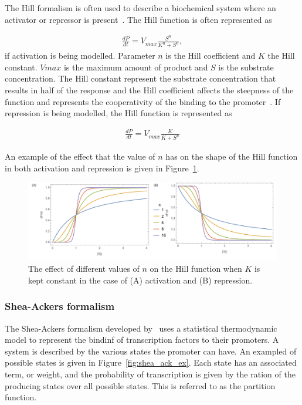 The Hill formalism is often used to describe a biochemical system where an activator or repressor is present~\autocite{Alon:2007}. The Hill function is often represented as

\begin{align*}
	\frac{dP}{dt} = V_{max}\frac{S^n}{K^n + S^n},
\end{align*}
\noindent if activation is being modelled. Parameter $n$ is the Hill coefficient and $K$ the Hill constant. $V{max}$ is the maximum amount of product and $S$ is the substrate concentration. The Hill constant represent the substrate concentration that results in half of the response and the Hill coefficient affects the steepness of the function and represents the cooperativity of the binding to the promoter~\autocite{Alon:2007}. If repression is being modelled, the Hill function is represented as

\begin{align*}
	\frac{dP}{dt} = V_{max}\frac{K}{K + S^n}
\end{align*}



\noindent An example of the effect that the value of $n$ has on the shape of the Hill function in both activation and repression is given in Figure~\ref{fig:hill_ex}.
\newpage

\begin{figure}[htb]
\centerfloat
    \includegraphics[scale=0.6]{../../chapters/chapterBackgr/images/hill_both-01.png}
    \caption[Hill formalism example]{The effect of different values of $n$ on the Hill function when $K$ is kept constant in the case of (A) activation and (B) repression.}
    \label{fig:hill_ex}
\end{figure}



\subsubsection{Shea-Ackers formalism}

The Shea-Ackers formalism developed by~\textcite{Ackers:1982tq} uses a statistical thermodynamic model to represent the bindinf of transcription factors to their promoters. A system is described by the various states the promoter can have. An exampled of possible states is given in Figure~\ref{fig:shea_ack_ex}. Each state has an associated term, or weight, and the probability of transcription is given by the ration of the producing states over all possible states. This is referred to as the partition function. 


